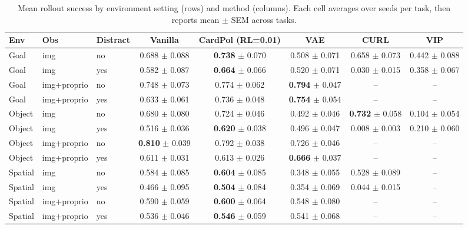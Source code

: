 \begin{table}
\small
\caption{Mean rollout success by environment setting (rows) and method (columns). Each cell averages over seeds per task, then reports mean $\pm$ SEM across tasks.}
\label{tab:method_env_success}
\begin{tabular}{lllccccc}
\toprule
Env & Obs & Distract & Vanilla & CardPol (RL=0.01) & VAE & CURL & VIP \\
\midrule
Goal & img & no & 0.688 $\pm$ 0.088 & \textbf{0.738} $\pm$ 0.070 & 0.508 $\pm$ 0.071 & 0.658 $\pm$ 0.073 & 0.442 $\pm$ 0.088 \\
Goal & img & yes & 0.582 $\pm$ 0.087 & \textbf{0.664} $\pm$ 0.066 & 0.520 $\pm$ 0.071 & 0.030 $\pm$ 0.015 & 0.358 $\pm$ 0.067 \\
Goal & img+proprio & no & 0.748 $\pm$ 0.073 & 0.774 $\pm$ 0.062 & \textbf{0.794} $\pm$ 0.047 & -- & -- \\
Goal & img+proprio & yes & 0.633 $\pm$ 0.061 & 0.736 $\pm$ 0.048 & \textbf{0.754} $\pm$ 0.054 & -- & -- \\
Object & img & no & 0.680 $\pm$ 0.080 & 0.724 $\pm$ 0.046 & 0.492 $\pm$ 0.046 & \textbf{0.732} $\pm$ 0.058 & 0.104 $\pm$ 0.054 \\
Object & img & yes & 0.516 $\pm$ 0.036 & \textbf{0.620} $\pm$ 0.038 & 0.496 $\pm$ 0.047 & 0.008 $\pm$ 0.003 & 0.210 $\pm$ 0.060 \\
Object & img+proprio & no & \textbf{0.810} $\pm$ 0.039 & 0.792 $\pm$ 0.038 & 0.726 $\pm$ 0.046 & -- & -- \\
Object & img+proprio & yes & 0.611 $\pm$ 0.031 & 0.613 $\pm$ 0.026 & \textbf{0.666} $\pm$ 0.037 & -- & -- \\
Spatial & img & no & 0.584 $\pm$ 0.085 & \textbf{0.604} $\pm$ 0.085 & 0.348 $\pm$ 0.055 & 0.528 $\pm$ 0.089 & -- \\
Spatial & img & yes & 0.466 $\pm$ 0.095 & \textbf{0.504} $\pm$ 0.084 & 0.354 $\pm$ 0.069 & 0.044 $\pm$ 0.015 & -- \\
Spatial & img+proprio & no & 0.590 $\pm$ 0.059 & \textbf{0.600} $\pm$ 0.064 & 0.548 $\pm$ 0.080 & -- & -- \\
Spatial & img+proprio & yes & 0.536 $\pm$ 0.046 & \textbf{0.546} $\pm$ 0.059 & 0.541 $\pm$ 0.068 & -- & -- \\
\bottomrule
\end{tabular}
\end{table}

